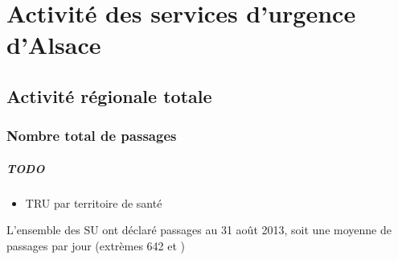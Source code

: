 \documentclass[12pt,english,french,twoside]{report}\usepackage[]{graphicx}\usepackage[]{color}
\begin{document}
\part{Activité des services d'urgence d'Alsace}
\chapter{Activité régionale totale}
\section{Nombre total de passages}

\subsubsection*{TODO} 
\begin{itemize}
  \item TRU par territoire de santé
\end{itemize}







L'ensemble des SU ont déclaré  passages au 31 août 2013, 
soit une moyenne de  passages par jour (extrèmes 642 et )
\end{document}
